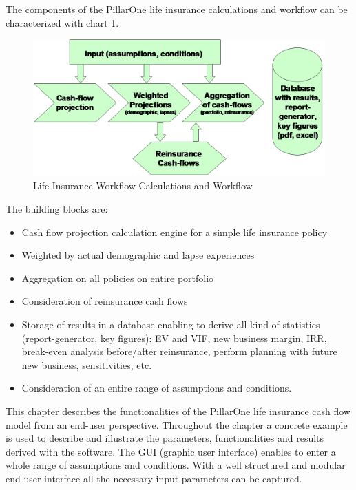 The components of the PillarOne life insurance calculations and workflow can be characterized with chart \ref{fig:lifeworkflow}.

\begin{figure}
\includegraphics[scale=0.7]{images/lifeworkflow.png}
	\caption{Life Insurance Workflow Calculations and Workflow}
	\label{fig:lifeworkflow}
\end{figure}

The building blocks are:

\begin{itemize}
	\item Cash flow projection calculation engine for a simple life insurance policy
	\item Weighted by actual demographic and lapse experiences
	\item Aggregation on all policies on entire portfolio
	\item Consideration of reinsurance cash flows
	\item Storage of results in a database enabling to derive all kind of statistics (report-generator, key figures): EV and VIF, new business margin, IRR, break-even analysis before/after reinsurance, perform planning with future new business, sensitivities, etc.
	\item Consideration of an entire range of assumptions and conditions.
\end{itemize}

This chapter describes the functionalities of the PillarOne life insurance cash flow model from an end-user perspective. Throughout the chapter a concrete example is used to describe and illustrate the parameters, functionalities and results derived with the software. The GUI (graphic user interface) enables to enter a whole range of assumptions and conditions. With a well structured and modular end-user interface all the necessary input parameters can be captured.


